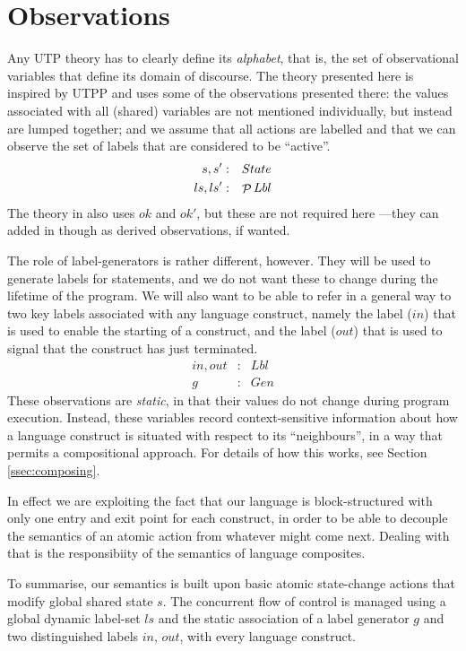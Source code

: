 \section{Observations}\label{sec:observe}

Any UTP theory has to clearly define its \emph{alphabet},
that is, the set of observational variables that define
its domain of discourse.
The theory presented here is inspired by UTPP\cite{DBLP:conf/icfem/WoodcockH02}
and uses some of the observations presented there:
the values associated with all (shared) variables
are not mentioned individually, but instead are lumped together;
and we assume that all actions are labelled and that we can observe
the set of labels that are considered to be ``active''.
\begin{eqnarray}
   s, s' &:& State
\\ ls, ls' &:& \mathop{\mathcal P} Lbl
\end{eqnarray}
The theory in \cite{DBLP:conf/icfem/WoodcockH02} also uses $ok$ and $ok'$,
but these are not required here
---they can added in though as derived observations, if wanted.

The role of label-generators is rather different, however.
They will be used to generate labels for statements,
and we do not want these to change during the lifetime of the program.
We will also want to be able to refer in a general way to two key labels
associated with any language construct,
namely the label ($in$) that is used to enable the starting of a construct,
and the label ($out$) that is used to signal that the construct has just terminated.
\begin{eqnarray}
   in, out &:& Lbl
\\ g &:& Gen
\end{eqnarray}
These observations are \emph{static},
in that their values do not change during program execution.
Instead, these variables record context-sensitive information about
how a language construct is situated with respect to its ``neighbours'',
in a way that permits a compositional approach.
For details of how this works, see Section \ref{ssec:composing}.


In effect we are exploiting the fact that our language is block-structured
with only one entry and exit point for each construct,
in order to be able to decouple the semantics of an atomic action
from whatever might come next.
Dealing with that is the responsibiity of the semantics of language composites.


To summarise,
our semantics is built upon basic atomic state-change
actions that modify global shared state $s$.
The concurrent flow of control is managed using a global dynamic label-set $ls$
and the static association of a label generator $g$
and two distinguished labels $in$, $out$,
with every language construct.

